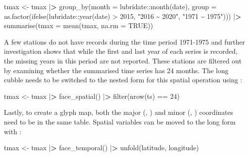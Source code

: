 \documentclass{article}
\newenvironment{Shaded}{\begin{snugshade}}{\end{snugshade}}
\newcommand{\AttributeTok}[1]{\textcolor[rgb]{0.77,0.63,0.00}{#1}}
\newcommand{\ConstantTok}[1]{\textcolor[rgb]{0.00,0.00,0.00}{#1}}
\newcommand{\DecValTok}[1]{\textcolor[rgb]{0.00,0.00,0.81}{#1}}
\newcommand{\ErrorTok}[1]{\textcolor[rgb]{0.64,0.00,0.00}{\textbf{#1}}}
\newcommand{\FunctionTok}[1]{\textcolor[rgb]{0.00,0.00,0.00}{#1}}
\newcommand{\NormalTok}[1]{#1}
\newcommand{\OtherTok}[1]{\textcolor[rgb]{0.56,0.35,0.01}{#1}}
\newcommand{\SpecialCharTok}[1]{\textcolor[rgb]{0.00,0.00,0.00}{#1}}
\newcommand{\StringTok}[1]{\textcolor[rgb]{0.31,0.60,0.02}{#1}}
\begin{document}
\begin{Shaded}
\begin{Highlighting}[]
\NormalTok{tmax }\OtherTok{\textless{}{-}}\NormalTok{ tmax }\SpecialCharTok{|}\ErrorTok{\textgreater{}}
  \FunctionTok{group\_by}\NormalTok{(}\AttributeTok{month =}\NormalTok{ lubridate}\SpecialCharTok{::}\FunctionTok{month}\NormalTok{(date),}
         \AttributeTok{group =} \FunctionTok{as.factor}\NormalTok{(}\FunctionTok{ifelse}\NormalTok{(lubridate}\SpecialCharTok{::}\FunctionTok{year}\NormalTok{(date) }\SpecialCharTok{\textgreater{}} \DecValTok{2015}\NormalTok{,}
                                  \StringTok{"2016 \textasciitilde{} 2020"}\NormalTok{, }\StringTok{"1971 \textasciitilde{} 1975"}\NormalTok{))) }\SpecialCharTok{|}\ErrorTok{\textgreater{}}
  \FunctionTok{summarise}\NormalTok{(}\AttributeTok{tmax =} \FunctionTok{mean}\NormalTok{(tmax, }\AttributeTok{na.rm =} \ConstantTok{TRUE}\NormalTok{))}
\end{Highlighting}
\end{Shaded}

A few stations do not have records during the time period 1971-1975 and further investigation shows that while the first and last year of each series is recorded, the missing years in this period are not reported. These stations are filtered out by examining whether the summarised time series has 24 months. The long cubble needs to be switched to the nested form for this spatial operation using :

\begin{Shaded}
\begin{Highlighting}[]
\NormalTok{tmax }\OtherTok{\textless{}{-}}\NormalTok{ tmax }\SpecialCharTok{|}\ErrorTok{\textgreater{}} \FunctionTok{face\_spatial}\NormalTok{() }\SpecialCharTok{|}\ErrorTok{\textgreater{}} \FunctionTok{filter}\NormalTok{(}\FunctionTok{nrow}\NormalTok{(ts) }\SpecialCharTok{==} \DecValTok{24}\NormalTok{)}
\end{Highlighting}
\end{Shaded}

Lastly, to create a glyph map, both the major (, ) and minor (, ) coordinates need to be in the same table. Spatial variables can be moved to the long form with :

\begin{Shaded}
\begin{Highlighting}[]
\NormalTok{tmax }\OtherTok{\textless{}{-}}\NormalTok{ tmax }\SpecialCharTok{|}\ErrorTok{\textgreater{}} \FunctionTok{face\_temporal}\NormalTok{() }\SpecialCharTok{|}\ErrorTok{\textgreater{}} \FunctionTok{unfold}\NormalTok{(latitude, longitude)}
\end{Highlighting}
\end{Shaded}
\end{document}

